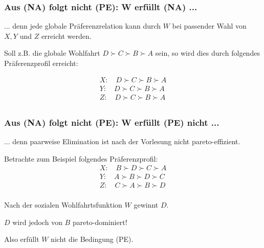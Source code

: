 
\begin{frame}
	\frametitle{Aus (NA) folgt nicht (PE): W erfüllt (NA) ...}
		
	... denn jede globale Präferenzrelation kann durch $W$ bei passender Wahl von $X,Y$ und $Z$ erreicht werden.
	
	Soll z.B. die globale Wohlfahrt $D \succ C \succ B \succ A$ sein, so wird dies durch folgendes Präferenzprofil erreicht:
	
	\begin{align*}
	X: \quad D \succ C \succ B \succ A \\
	Y: \quad D \succ C \succ B \succ A \\
	Z: \quad D \succ C \succ B \succ A \\
	\end{align*}
	
\end{frame}


\begin{frame}
	\frametitle{Aus (NA) folgt nicht (PE): W erfüllt (PE) nicht ...}
	
	... denn paarweise Elimination ist nach der Vorlesung nicht pareto-effizient.
	
	Betrachte zum Beispiel folgendes Präferenzprofil:
	\vspace*{.5em}
	\begin{align*}
	X: \quad B \succ D \succ C \succ A \\
	Y: \quad A \succ B \succ D \succ C \\
	Z: \quad C \succ A \succ B \succ D \\
	\end{align*}

	Nach der sozialen Wohlfahrtsfunktion $W$ gewinnt $D$.
	
	$D$ wird jedoch von $B$ pareto-dominiert!
	
	Also erfüllt $W$ nicht die Bedingung (PE).
\end{frame}

\begin{comment}

\begin{frame}
	\frametitle{Beispiel 4}
	
	
\end{frame}


\begin{frame}
	\frametitle{Beispiel 4}
	
	
\end{frame}

\end{comment}

\clearpage